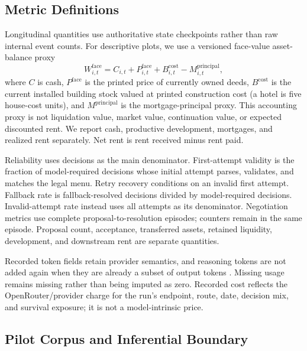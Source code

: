 \documentclass[conference]{IEEEtran}
\begin{document}
\subsection{Metric Definitions}
\label{sec:metrics}

Longitudinal quantities use authoritative state checkpoints rather than raw
internal event counts. For descriptive plots, we use a versioned face-value
asset-balance proxy
\begin{equation}
W^{\mathrm{face}}_{i,t}
= C_{i,t}+P^{\mathrm{face}}_{i,t}+B^{\mathrm{cost}}_{i,t}
-M^{\mathrm{principal}}_{i,t},
\label{eq:face_wealth}
\end{equation}
where $C$ is cash, $P^{\mathrm{face}}$ is the printed price of currently owned
deeds, $B^{\mathrm{cost}}$ is the current installed building stock valued at
printed construction cost (a hotel is five house-cost units), and
$M^{\mathrm{principal}}$ is the mortgage-principal proxy. This accounting
proxy is not liquidation value, market value, continuation value, or expected
discounted rent. We report cash, productive development, mortgages, and
realized rent separately. Net rent is rent received minus rent paid.

Reliability uses decisions as the main denominator. First-attempt validity is
the fraction of model-required decisions whose initial attempt parses,
validates, and matches the legal menu. Retry recovery conditions on an
invalid first attempt. Fallback rate is fallback-resolved decisions divided
by model-required decisions. Invalid-attempt rate instead uses all attempts as
its denominator. Negotiation metrics use complete proposal-to-resolution
episodes; counters remain in the same episode. Proposal count, acceptance,
transferred assets, retained
liquidity, development, and downstream rent are separate quantities.

Recorded token fields retain provider semantics, and reasoning tokens are not
added again when they are already a subset of output tokens
\cite{openrouter_docs}. Missing usage remains missing rather than being
imputed as zero. Recorded cost reflects the OpenRouter/provider charge for the
run's endpoint, route, date, decision mix, and survival exposure; it is not a
model-intrinsic price.

\subsection{Pilot Corpus and Inferential Boundary}
\end{document}
